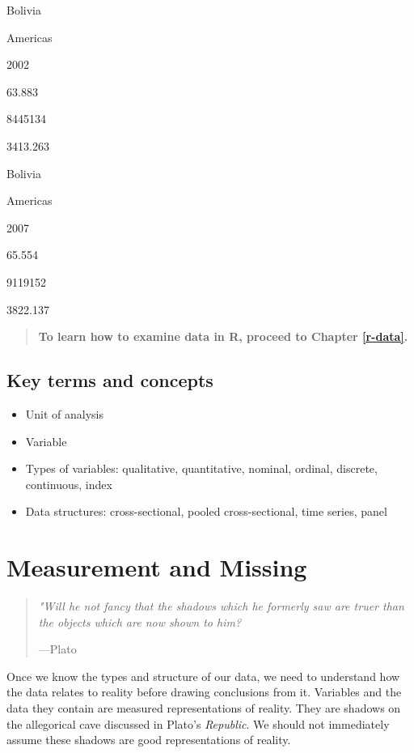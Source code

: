 \documentclass[
]{book}
\providecommand{\tightlist}{%
  \setlength{\itemsep}{0pt}\setlength{\parskip}{0pt}}
\newenvironment{learncheck}%
{%
  \par\vspace{\baselineskip}\noindent 
  \color{Exercise}\begin{itshape}%
  \par\vspace{\baselineskip}\noindent\ignorespaces 
}%
{%
  \end{itshape}\ignorespacesafterend 
}
\begin{document}
Bolivia

Americas

2002

63.883

8445134

3413.263

Bolivia

Americas

2007

65.554

9119152

3822.137

\begin{quote}
\textbf{To learn how to examine data in R, proceed to Chapter \ref{r-data}.}
\end{quote}

\hypertarget{kt1}{%
\section{Key terms and concepts}\label{kt1}}

\begin{learncheck}
\begin{itemize}
\tightlist
\item
  Unit of analysis
\item
  Variable
\item
  Types of variables: qualitative, quantitative, nominal, ordinal,
  discrete, continuous, index
\item
  Data structures: cross-sectional, pooled cross-sectional, time series,
  panel
\end{itemize}
\end{learncheck}

\hypertarget{measurement-and-missing}{%
\chapter{Measurement and Missing}\label{measurement-and-missing}}

\begin{quote}
\emph{"Will he not fancy that the shadows which he formerly saw are truer than the objects which are now shown to him?}

---Plato
\end{quote}

Once we know the types and structure of our data, we need to understand how the data relates to reality before drawing conclusions from it. Variables and the data they contain are measured representations of reality. They are shadows on the allegorical cave discussed in Plato's \emph{Republic}. We should not immediately assume these shadows are good representations of reality.
\end{document}
